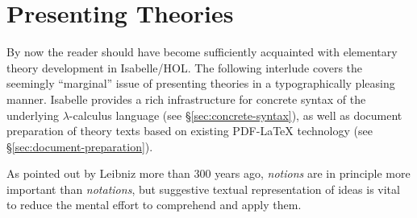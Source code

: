 
\chapter{Presenting Theories}
\label{ch:thy-present}

By now the reader should have become sufficiently acquainted with elementary
theory development in Isabelle/HOL.  The following interlude covers the
seemingly ``marginal'' issue of presenting theories in a typographically
pleasing manner.  Isabelle provides a rich infrastructure for concrete syntax
of the underlying $\lambda$-calculus language (see
\S\ref{sec:concrete-syntax}), as well as document preparation of theory texts
based on existing PDF-{\LaTeX} technology (see
\S\ref{sec:document-preparation}).

As pointed out by Leibniz more than 300
years ago, \emph{notions} are in principle more important than
\emph{notations}, but suggestive textual representation of ideas is vital to
reduce the mental effort to comprehend and apply them.



